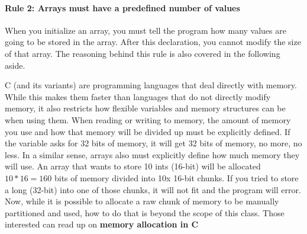     \paragraph*{Rule 2: Arrays must have a predefined number of values} When you initialize an array, you must tell the program how many values are going to be stored in the array. After this declaration, you 
    cannot modify the size of that array. The reasoning behind this rule is also covered in the following aside.
    \begin{kaobox}[frametitle=Aside: The weird world of memory allocation]
        C (and its variants) are programming languages that deal directly with memory. While this makes them faster than languages that do not directly modify memory, it also restricts how flexible variables
        and memory structures can be when using them. When reading or writing to memory, the amount of memory you use and how that memory will be divided up must be explicitly defined. If the variable asks 
        for 32 bits of memory, it will get 32 bits of memory, no more, no less. In a similar sense, arrays also must explicitly define how much memory they will use. An array that wants to store 10 ints 
        (16-bit) will be allocated $10 * 16 = 160$ bits of memory divided into 10x 16-bit chunks. If you tried to store a long (32-bit) into one of those chunks, it will not fit and the program will error. Now,
        while it is possible to allocate a raw chunk of memory to be manually partitioned and used, how to do that is beyond the scope of this class. Those interested can read up on \textbf{memory allocation
        in C}
    \end{kaobox}
